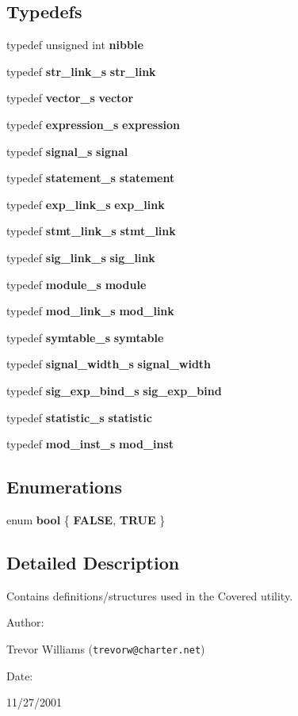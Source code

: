 \subsection*{Typedefs}
\begin{CompactItemize}
\item 
typedef unsigned int {\bf nibble}
\item 
typedef {\bf str\_\-link\_\-s} {\bf str\_\-link}
\item 
typedef {\bf vector\_\-s} {\bf vector}
\item 
typedef {\bf expression\_\-s} {\bf expression}
\item 
typedef {\bf signal\_\-s} {\bf signal}
\item 
typedef {\bf statement\_\-s} {\bf statement}
\item 
typedef {\bf exp\_\-link\_\-s} {\bf exp\_\-link}
\item 
typedef {\bf stmt\_\-link\_\-s} {\bf stmt\_\-link}
\item 
typedef {\bf sig\_\-link\_\-s} {\bf sig\_\-link}
\item 
typedef {\bf module\_\-s} {\bf module}
\item 
typedef {\bf mod\_\-link\_\-s} {\bf mod\_\-link}
\item 
typedef {\bf symtable\_\-s} {\bf symtable}
\item 
typedef {\bf signal\_\-width\_\-s} {\bf signal\_\-width}
\item 
typedef {\bf sig\_\-exp\_\-bind\_\-s} {\bf sig\_\-exp\_\-bind}
\item 
typedef {\bf statistic\_\-s} {\bf statistic}
\item 
typedef {\bf mod\_\-inst\_\-s} {\bf mod\_\-inst}
\end{CompactItemize}
\subsection*{Enumerations}
\begin{CompactItemize}
\item 
enum {\bf bool} \{ {\bf FALSE}, 
{\bf TRUE}
 \}
\end{CompactItemize}


\subsection{Detailed Description}
Contains definitions/structures used in the Covered utility.



\begin{Desc}
\item[Author: ]\par
Trevor Williams ({\tt trevorw@charter.net}) \end{Desc}
\begin{Desc}
\item[Date: ]\par
11/27/2001\end{Desc}


